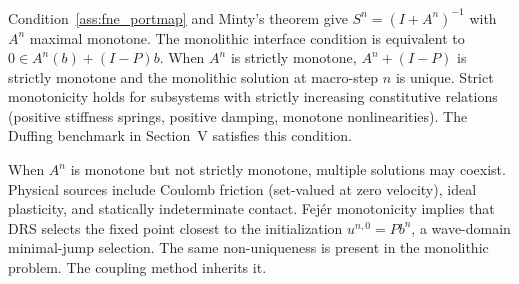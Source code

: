 \begin{remark}
\label{rem:uniqueness}
Condition~\ref{ass:fne_portmap} and Minty's theorem give $S^n = (I+A^n)^{-1}$ with $A^n$ maximal monotone. The monolithic interface condition is equivalent to $0 \in A^n(b) + (I-P)b$. When $A^n$ is strictly monotone, $A^n + (I-P)$ is strictly monotone and the monolithic solution at macro-step $n$ is unique. Strict monotonicity holds for subsystems with strictly increasing constitutive relations (positive stiffness springs, positive damping, monotone nonlinearities). The Duffing benchmark in Section~V satisfies this condition.

When $A^n$ is monotone but not strictly monotone, multiple solutions may coexist. Physical sources include Coulomb friction (set-valued at zero velocity), ideal plasticity, and statically indeterminate contact. Fej\'er monotonicity implies that DRS selects the fixed point closest to the initialization $u^{n,0}=P b^n$, a wave-domain minimal-jump selection. The same non-uniqueness is present in the monolithic problem. The coupling method inherits it.
\end{remark}

